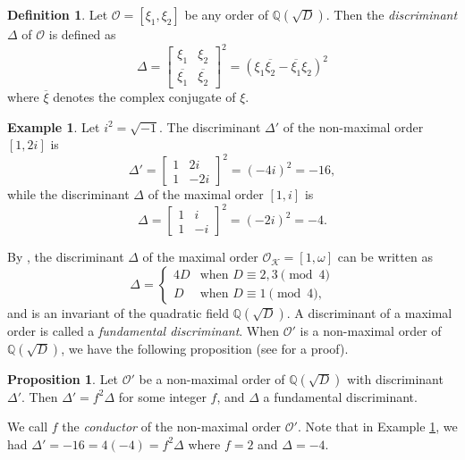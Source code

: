 \documentclass{ucalgthes1}
\theoremstyle{definition}
\newtheorem{prop}[thm]{Proposition}
\newtheorem{defn}[thm]{Definition}
\newtheorem{example}[thm]{Example}
\newcommand{\QQ}{\mathbb{Q}}
\newcommand{\KK}{\mathcal{K}}
\newcommand{\OO}{\mathcal{O}}
\begin{document}
\begin{defn}
\cite[Definition 4.16]{Jacobson2009} Let $\OO = [\xi_1, \xi_2]$ be any order of $\QQ(\sqrt D)$.  Then the \emph{discriminant} $\Delta$ of $\OO$ is defined as
\[
	\Delta = {\left[ \begin{array}{rr} \xi_1 & \xi_2 \\ \overline{\xi_1} & \overline{\xi_2} \end{array} \right]}^2
	       = (\xi_1 \overline{\xi_2} - \overline{\xi_1} \xi_2)^2
\]
where $\overline{\xi}$ denotes the complex conjugate of $\xi$.
\end{defn}

\begin{example}
\label{ex:discriminant}
Let $i^2 = \sqrt{-1}$.  The discriminant $\Delta'$ of the non-maximal order $[1, 2 i]$ is
\[
	\Delta' = {\left[ \begin{array}{rr} 1 & 2i \\ 1 & -2i \end{array} \right]}^2 = (-4i)^2 = -16,
\]
while the discriminant $\Delta$ of the maximal order $[1,i]$ is
\[
	\Delta = {\left[ \begin{array}{rr} 1 & i \\ 1 & -i \end{array} \right]}^2 = (-2i)^2 = -4.
\]
\end{example}

By \cite[p.13]{Ramachandran2006}, the discriminant $\Delta$ of the maximal order $\OO_\KK = [1, \omega]$ can be written as
\[
\Delta = \begin{cases}
	4D & \textrm{when } D \equiv 2, 3 \pmod 4 \\
	D  & \textrm{when } D \equiv 1 \pmod 4,
\end{cases}
\]
and is an invariant of the quadratic field $\QQ(\sqrt D)$.  A discriminant of a maximal order is called a \emph{fundamental discriminant}.  When $\OO'$ is a non-maximal order of $\QQ(\sqrt D)$, we have the following proposition (see \cite[p.216]{Cohn1980} for a proof).

\begin{prop}
Let $\OO'$ be a non-maximal order of $\QQ(\sqrt D)$ with discriminant $\Delta'$.  Then $\Delta' = f^2 \Delta$ for some integer $f$, and $\Delta$ a fundamental discriminant.
\end{prop}

\noindent
We call $f$ the \emph{conductor} of the non-maximal order $\OO'$.  Note that in Example \ref{ex:discriminant}, we had $\Delta' = -16 = 4(-4) = f^2\Delta$ where $f = 2$ and $\Delta = -4$.
\end{document}

